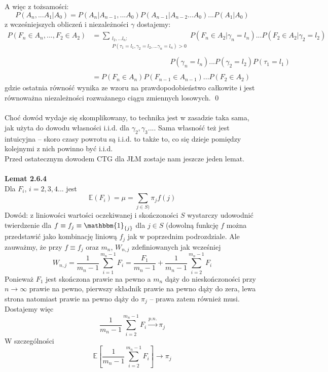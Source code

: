 \documentclass[a4paper]{article}
\begin{document}
A więc z tożsamości:
$$P(A_n, ... A_1|A_0) = P(A_n|A_{n-1}, ...A_0)P(A_{n-1}|A_{n-2}...A_0)...P(A_1|A_0)$$
z wcześniejszych obliczeń i niezależności $\gamma$ dostajemy:
\begin{align*}
    P(F_n \in A_n, ..., F_2 \in A_2) &= \sum\limits_{\substack{l_2, ... l_n:\\P(\tau_1 = l_1, \gamma_2 = l_2, ... \gamma_n = l_n) > 0}} P(F_n \in A_2|\gamma_n = l_n) ... P(F_2 \in A_2|\gamma_2 = l_2)\\\\
    &\quad\quad\quad\quad\quad\quad\quad\quad\quad\quad\quad P(\gamma_n = l_n) ... P(\gamma_2 = l_2)P(\tau_1 = l_1)\\\\
    &= P(F_n \in A_n)P(F_{n-1} \in A_{n-1}) ... P(F_2 \in A_2)
\end{align*}
gdzie ostatnia równość wynika ze wzoru na prawdopodobieństwo całkowite i jest równoważna niezależności rozważanego ciągu zmiennych losowych. \qed
\\\\
Choć dowód wydaje się skomplikowany, to technika jest w zasadzie taka sama, jak użyta do dowodu własności i.i.d. dla $\gamma_2, \gamma_3 ...$. Sama własność też jest intuicyjna – skoro czasy powrotu są i.i.d. to także to, co się dzieje pomiędzy kolejnymi z nich powinno być i.i.d.\\
Przed ostatecznym dowodem CTG dla JŁM zostaje nam jeszcze jeden lemat.\\
\\
\textbf{Lemat 2.6.4}\\
Dla $F_i$, $i=2,3,4...$ jest
$$\mathbb{E}(F_i) = \mu = \sum\limits_{j \in S)} \pi_j f(j)$$
Dowód: z liniowości wartości oczekiwanej i skończoności $S$ wystarczy udowodnić twierdzenie dla $f \equiv f_j \equiv \mathbbm{1}_{\{j\}}$ dla $j \in S$ (dowolną funkcję $f$ można przedstawić jako kombinację liniową $f_j$ jak w poprzednim podrozdziale. Ale zauważmy, że przy $f \equiv f_j$ oraz $m_n$, $W_{n, j}$ zdefiniowanych jak wcześniej $$W_{n, j} = \frac{1}{m_n -1}\sum\limits_{i = 1}^{m_n -1} F_i = \frac{F_1}{m_n - 1} + \frac{1}{m_n - 1} \sum\limits_{i = 2}^{m_n - 1} F_i$$
Ponieważ $F_1$ jest skończona prawie na pewno a $m_n$ dąży do nieskończoności przy $n \to \infty$ prawie na pewno, pierwszy składnik prawie na pewno dąży do zera, lewa strona natomiast prawie na pewno dąży do $\pi_j$ – prawa zatem również musi. Dostajemy więc
$$\frac{1}{m_n - 1} \sum\limits_{i = 2}^{m_n - 1} F_i \overset{p.n.}{\to} \pi_j$$
W szczególności
$$\mathbb{E}\left[\frac{1}{m_n - 1} \sum\limits_{i = 2}^{m_n - 1} F_i\right] \to \pi_j$$
\end{document}
